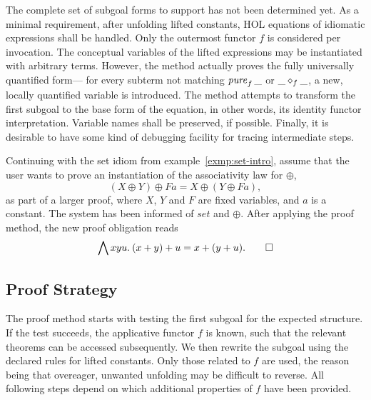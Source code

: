 The complete set of subgoal forms to support has not been determined yet.
\todo{}
As a minimal requirement, after unfolding lifted constants, HOL equations of
idiomatic expressions shall be handled.
Only the outermost functor $f$ is considered per invocation.
The conceptual variables of the lifted expressions may be instantiated with
arbitrary terms.
However, the method actually proves the fully universally quantified form---%
for every subterm not matching $\operatorname{\mathit{pure}}_f{\_}$ or $\_ \diamond_f \_$, a new, locally
quantified variable is introduced.
The method attempts to transform the first subgoal to the base form of the
equation, in other words, its identity functor interpretation.
Variable names shall be preserved, if possible.
Finally, it is desirable to have some kind of debugging facility for tracing
intermediate steps.

\begin{example}\label{exmp:set-usage}
Continuing with the set idiom from example~\ref{exmp:set-intro}, assume that
the user wants to prove an instantiation of the associativity law for $\oplus$,
\[ (X \oplus Y) \oplus F a = X \oplus (Y \oplus F a), \]
as part of a larger proof, where $X$, $Y$ and $F$ are fixed variables, and
$a$ is a constant.
The system has been informed of $\mathit{set}$ and $\oplus$.
After applying the proof method, the new proof obligation reads
\[ \bigwedge x y u.\>(x + y) + u = x + (y + u). \qedhere \]
\end{example}

\subsection{Proof Strategy}\label{subsec:proof-strategy}

The proof method starts with testing the first subgoal for the expected
structure.
If the test succeeds, the applicative functor $f$ is known, such that the
relevant theorems can be accessed subsequently.
We then rewrite the subgoal using the declared rules for lifted constants.
Only those related to $f$ are used, the reason being that overeager, unwanted
unfolding may be difficult to reverse.
All following steps depend on which additional properties of $f$ have been
provided.

